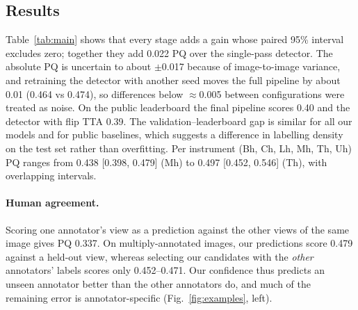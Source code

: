 \documentclass[sigconf]{acmart}
\begin{document}
\begin{table}[t]\centering\small
\caption{Validation PQ (fold 0, 142 images) with 95\% bootstrap CIs, and the paired gain of the final pipeline over each intermediate stage. Each stage uses its own calibrated thresholds.}\label{tab:main}
\setlength{\tabcolsep}{3pt}
\end{table}

\subsection{Results}
Table~\ref{tab:main} shows that every stage adds a gain whose paired 95\% interval excludes zero; together they add 0.022 PQ over the single-pass detector. The absolute PQ is uncertain to about $\pm$0.017 because of image-to-image variance, and retraining the detector with another seed moves the full pipeline by about 0.01 (0.464 vs 0.474), so differences below $\approx$0.005 between configurations were treated as noise. On the public leaderboard the final pipeline scores 0.40 and the detector with flip TTA 0.39. The validation--leaderboard gap is similar for all our models and for public baselines, which suggests a difference in labelling density on the test set rather than overfitting. Per instrument (Bh, Ch, Lh, Mh, Th, Uh) PQ ranges from 0.438 [0.398, 0.479] (Mh) to 0.497 [0.452, 0.546] (Th), with overlapping intervals.

\paragraph{Human agreement.} Scoring one annotator's view as a prediction against the other views of the same image gives PQ 0.337. On multiply-annotated images, our predictions score 0.479 against a held-out view, whereas selecting our candidates with the \emph{other} annotators' labels scores only 0.452--0.471. Our confidence thus predicts an unseen annotator better than the other annotators do, and much of the remaining error is annotator-specific (Fig.~\ref{fig:examples}, left).
\end{document}
